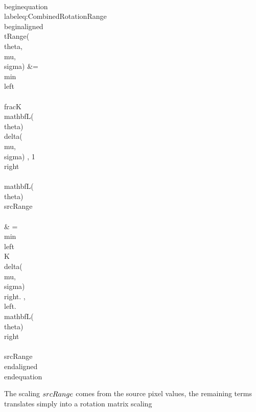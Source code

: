 \\begin{equation}\\label{eq:CombinedRotationRange}
\\begin{aligned}
 \\tRange(\\theta,\\mu,\\sigma) &= \\min\\left\\{ \\frac{K}{\\mathbf{L}(\\theta)}   \\delta(\\mu,\\sigma) , 1 \\right\\} \\mathbf{L}(\\theta) \\srcRange  \\\\
  & =  \\min\\left\\{K \\delta(\\mu,\\sigma) \\right. ,  \\left. \\mathbf{L}(\\theta) \\right\\}  \\srcRange
\\end{aligned}
\\end{equation}

The scaling $\\srcRange$ comes from the source pixel values, the remaining terms translates simply into a rotation matrix scaling

